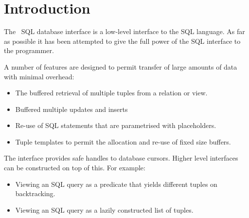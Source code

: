 %
% 
% 
% 
% 

\section{Introduction}

The \eclipse\ SQL database interface is a low-level interface to the SQL
language. As far as possible it has been attempted to give the
full power of the SQL interface to the programmer.

A number of features are designed to permit transfer of large amounts
of data with minimal overhead:
\begin{itemize}
\item The buffered retrieval of multiple tuples from
a relation or view.
\item Buffered multiple updates and inserts
\item Re-use of SQL statements that are parametrised with placeholders.
\item Tuple templates to permit the allocation  and re-use of fixed size
buffers.
\end{itemize}

The interface provides safe handles to database cursors. Higher
level interfaces can be constructed on top of this. For
example:

\begin{itemize}
\item Viewing an SQL query as a predicate that yields
different tuples on backtracking.
\item Viewing an SQL query as a lazily constructed list of tuples.
\end{itemize}

